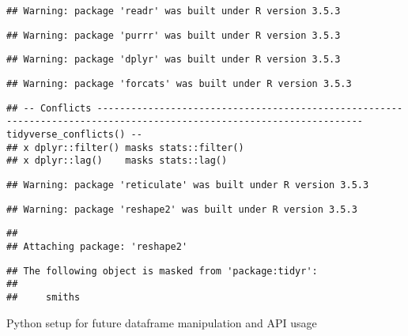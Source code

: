 \documentclass[
]{article}
\begin{document}
\begin{verbatim}
## Warning: package 'readr' was built under R version 3.5.3
\end{verbatim}

\begin{verbatim}
## Warning: package 'purrr' was built under R version 3.5.3
\end{verbatim}

\begin{verbatim}
## Warning: package 'dplyr' was built under R version 3.5.3
\end{verbatim}

\begin{verbatim}
## Warning: package 'forcats' was built under R version 3.5.3
\end{verbatim}

\begin{verbatim}
## -- Conflicts --------------------------------------------------------------------------------------------------------------------- tidyverse_conflicts() --
## x dplyr::filter() masks stats::filter()
## x dplyr::lag()    masks stats::lag()
\end{verbatim}

\begin{verbatim}
## Warning: package 'reticulate' was built under R version 3.5.3
\end{verbatim}

\begin{verbatim}
## Warning: package 'reshape2' was built under R version 3.5.3
\end{verbatim}

\begin{verbatim}
## 
## Attaching package: 'reshape2'
\end{verbatim}

\begin{verbatim}
## The following object is masked from 'package:tidyr':
## 
##     smiths
\end{verbatim}

Python setup for future dataframe manipulation and API usage
\end{document}
